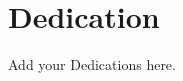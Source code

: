 \chapter*{Dedication}

\begin{flushleft}
  \begin{vplace}[0.7]
    Add your Dedications here.
  \end{vplace}
\end{flushleft}
